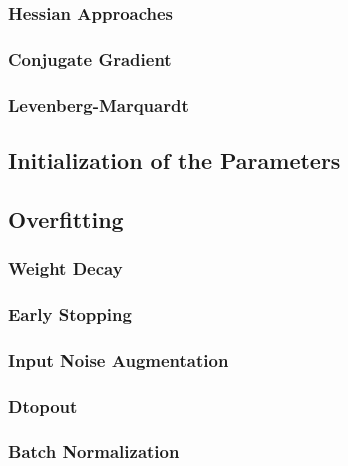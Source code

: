 			\subsubsection{Hessian Approaches} %

			\subsubsection{Conjugate Gradient} %

			\subsubsection{Levenberg-Marquardt} %

		\subsection{Initialization of the Parameters} %

		\subsection{Overfitting} %

			\subsubsection{Weight Decay} %

			\subsubsection{Early Stopping} %

			\subsubsection{Input Noise Augmentation} %

			\subsubsection{Dtopout} %

			\subsubsection{Batch Normalization} %

